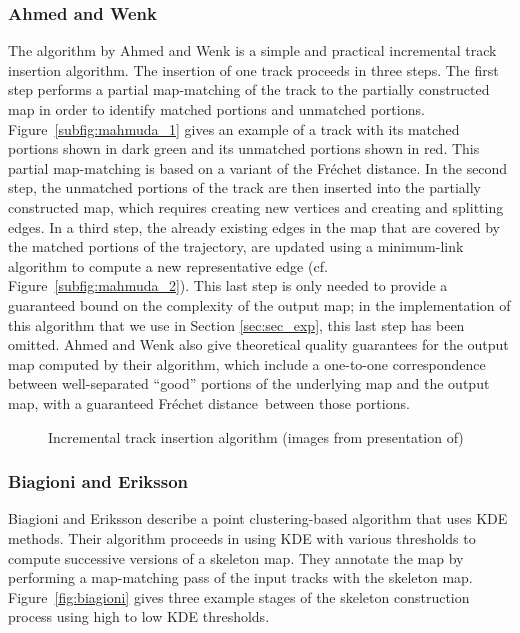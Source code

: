\documentclass[natbib]{svjour3}                    \smartqed  \usepackage[table]{xcolor}
\newcommand{\Frd}{Fr\'echet distance}
\begin{document}
\subsubsection{Ahmed and Wenk \protect\cite{csm_esa2012}}
\label{subsub:subsub_aw}
The algorithm by Ahmed and Wenk \cite{csm_esa2012} is a simple and practical incremental track insertion algorithm. The insertion of one track proceeds in three steps. The first step performs a partial map-matching of the track to the partially constructed map in order to identify matched portions and unmatched portions. Figure~\ref{subfig:mahmuda_1} gives an example of a track with its matched portions shown in dark green and its unmatched portions shown in red. 
This partial map-matching is based on a variant of the \Frd. In the second step, the unmatched portions of the track are then inserted into the partially constructed map, which requires creating new vertices and creating and splitting edges. In a third step, the already existing edges in the map that are covered by the matched portions of the trajectory, are updated using a minimum-link algorithm to compute a new representative edge (cf. Figure~\ref{subfig:mahmuda_2}). This last step is only needed to provide a guaranteed bound on the complexity of the output map; in the implementation of this algorithm that we use in Section \ref{sec:sec_exp}, this last step has been omitted. Ahmed and Wenk also give theoretical quality guarantees for the output map computed by their algorithm, which include a one-to-one correspondence between well-separated ``good'' portions of the underlying map and the output map, with a guaranteed \Frd\ between those portions. 


\begin{figure}[btph]
 \begin{center}
 \end{center}
\caption{Incremental track insertion algorithm (images from presentation of\cite{csm_esa2012})}
\label{fig:mahmuda}
\end{figure}

\subsubsection{Biagioni and Eriksson \protect\cite{Biagioni:2012:MIF:2424321.2424333}}
Biagioni and Eriksson \cite{Biagioni:2012:MIF:2424321.2424333} describe a point clustering-based algorithm that uses KDE methods. Their algorithm proceeds in using KDE with various thresholds to compute successive versions of a skeleton map. They annotate the map by performing a map-matching pass of the input tracks with the skeleton map. 
Figure~\ref{fig:biagioni} gives three example stages of the skeleton construction process using high to low KDE thresholds.
\end{document}
